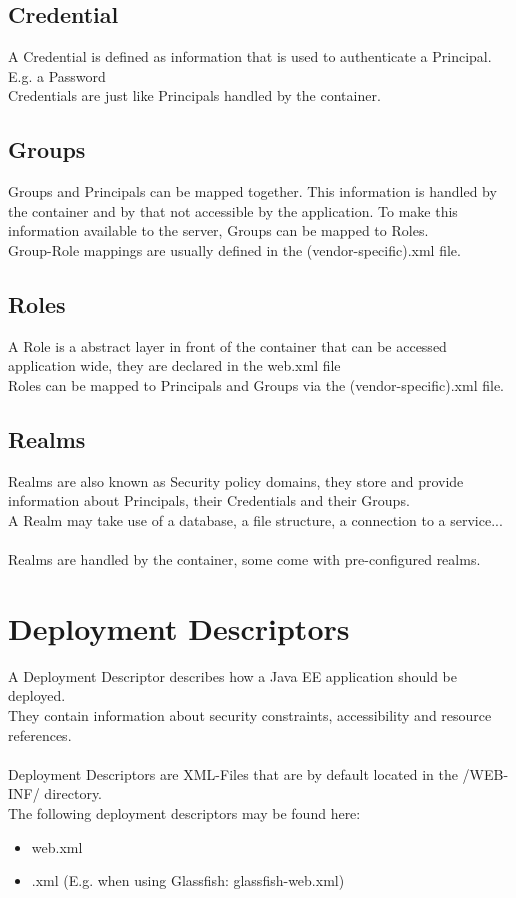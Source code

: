 \documentclass[12pt,a4paper]{report}
\begin{document}
\section{Credential}
A Credential is defined as information that is used to authenticate a Principal.\\
E.g. a Password\\
Credentials are just like Principals handled by the container.

\section{Groups}
Groups and Principals can be mapped together. This information is handled by the container and by that not accessible by the application. To make this information available to the server, Groups can be mapped to Roles.\\
Group-Role mappings are usually defined in the (vendor-specific).xml file.\\

\section{Roles}
A Role is a abstract layer in front of the container that can be accessed application wide, they are declared in the web.xml file\\
Roles can be mapped to Principals and Groups via the (vendor-specific).xml file.\\

\section{Realms}
Realms are also known as Security policy domains, they store and provide information about Principals, their Credentials and their Groups.\\
A Realm may take use of a database, a file structure, a connection to a service...\\\\
Realms are handled by the container, some come with pre-configured realms.

\chapter{Deployment Descriptors}
A Deployment Descriptor describes how a Java EE application should be deployed.\\
They contain information about security constraints, accessibility and resource references.\\\\
Deployment Descriptors are XML-Files that are by default located in the /WEB-INF/ directory.\\
The following deployment descriptors may be found here:
\begin{itemize}
	\item web.xml
	\item <vendor-specific>.xml (E.g. when using Glassfish: glassfish-web.xml)
\end{itemize}
\end{document}
